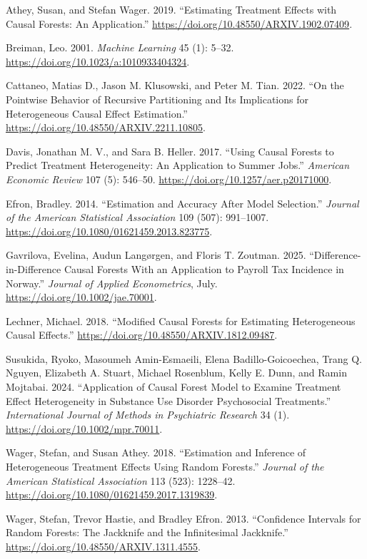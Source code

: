 \documentclass[
  12pt,
  a4paper,
  oneside]{article}
\newlength{\cslhangindent}
\newenvironment{CSLReferences}[2] %
 {\begin{list}{}{%
  \setlength{\itemindent}{0pt}
  \setlength{\leftmargin}{0pt}
  \setlength{\parsep}{0pt}
  \ifodd #1
   \setlength{\leftmargin}{\cslhangindent}
   \setlength{\itemindent}{-1\cslhangindent}
  \fi
  \setlength{\itemsep}{#2\baselineskip}}}
 {\end{list}}
\begin{document}
\label{refs}
\begin{CSLReferences}{1}{0}
Athey, Susan, and Stefan Wager. 2019. {``Estimating Treatment Effects
with Causal Forests: An Application.''}
\url{https://doi.org/10.48550/ARXIV.1902.07409}.

Breiman, Leo. 2001. \emph{Machine Learning} 45 (1): 5--32.
\url{https://doi.org/10.1023/a:1010933404324}.

Cattaneo, Matias D., Jason M. Klusowski, and Peter M. Tian. 2022. {``On
the Pointwise Behavior of Recursive Partitioning and Its Implications
for Heterogeneous Causal Effect Estimation.''}
\url{https://doi.org/10.48550/ARXIV.2211.10805}.

Davis, Jonathan M. V., and Sara B. Heller. 2017. {``Using Causal Forests
to Predict Treatment Heterogeneity: An Application to Summer Jobs.''}
\emph{American Economic Review} 107 (5): 546--50.
\url{https://doi.org/10.1257/aer.p20171000}.

Efron, Bradley. 2014. {``Estimation and Accuracy After Model
Selection.''} \emph{Journal of the American Statistical Association} 109
(507): 991--1007. \url{https://doi.org/10.1080/01621459.2013.823775}.

Gavrilova, Evelina, Audun Langørgen, and Floris T. Zoutman. 2025.
{``Difference{-}in{-}Difference Causal Forests With an Application to
Payroll Tax Incidence in Norway.''} \emph{Journal of Applied
Econometrics}, July. \url{https://doi.org/10.1002/jae.70001}.

Lechner, Michael. 2018. {``Modified Causal Forests for Estimating
Heterogeneous Causal Effects.''}
\url{https://doi.org/10.48550/ARXIV.1812.09487}.

Susukida, Ryoko, Masoumeh Amin-Esmaeili, Elena Badillo-Goicoechea, Trang
Q. Nguyen, Elizabeth A. Stuart, Michael Rosenblum, Kelly E. Dunn, and
Ramin Mojtabai. 2024. {``Application of Causal Forest Model to Examine
Treatment Effect Heterogeneity in Substance Use Disorder Psychosocial
Treatments.''} \emph{International Journal of Methods in Psychiatric
Research} 34 (1). \url{https://doi.org/10.1002/mpr.70011}.

Wager, Stefan, and Susan Athey. 2018. {``Estimation and Inference of
Heterogeneous Treatment Effects Using Random Forests.''} \emph{Journal
of the American Statistical Association} 113 (523): 1228--42.
\url{https://doi.org/10.1080/01621459.2017.1319839}.

Wager, Stefan, Trevor Hastie, and Bradley Efron. 2013. {``Confidence
Intervals for Random Forests: The Jackknife and the Infinitesimal
Jackknife.''} \url{https://doi.org/10.48550/ARXIV.1311.4555}.

\end{CSLReferences}
\end{document}

